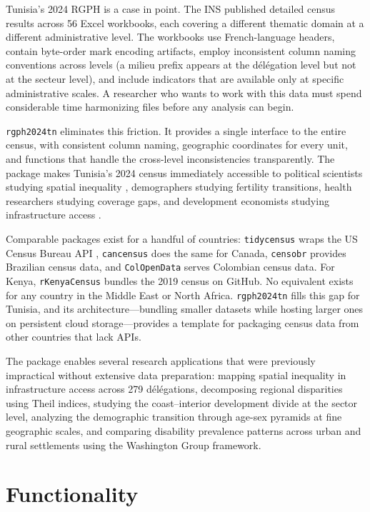 \documentclass[12pt]{article}
\begin{document}
Tunisia's 2024 RGPH is a case in point. The INS published detailed census results across 56 Excel workbooks, each covering a different thematic domain at a different administrative level. The workbooks use French-language headers, contain byte-order mark encoding artifacts, employ inconsistent column naming conventions across levels (a milieu prefix appears at the d\'{e}l\'{e}gation level but not at the secteur level), and include indicators that are available only at specific administrative scales. A researcher who wants to work with this data must spend considerable time harmonizing files before any analysis can begin.

\texttt{rgph2024tn} eliminates this friction. It provides a single interface to the entire census, with consistent column naming, geographic coordinates for every unit, and functions that handle the cross-level inconsistencies transparently. The package makes Tunisia's 2024 census immediately accessible to political scientists studying spatial inequality \citep{porteous2022research}, demographers studying fertility transitions, health researchers studying coverage gaps, and development economists studying infrastructure access \citep{stacy2025datause}.

Comparable packages exist for a handful of countries: \texttt{tidycensus} wraps the US Census Bureau API \citep{walker2023tidycensus}, \texttt{cancensus} does the same for Canada, \texttt{censobr} provides Brazilian census data, and \texttt{ColOpenData} serves Colombian census data. For Kenya, \texttt{rKenyaCensus} bundles the 2019 census on GitHub. No equivalent exists for any country in the Middle East or North Africa. \texttt{rgph2024tn} fills this gap for Tunisia, and its architecture---bundling smaller datasets while hosting larger ones on persistent cloud storage---provides a template for packaging census data from other countries that lack APIs.

The package enables several research applications that were previously impractical without extensive data preparation: mapping spatial inequality in infrastructure access across 279 d\'{e}l\'{e}gations, decomposing regional disparities using Theil indices, studying the coast--interior development divide at the sector level, analyzing the demographic transition through age-sex pyramids at fine geographic scales, and comparing disability prevalence patterns across urban and rural settlements using the Washington Group framework.


\section*{Functionality}
\end{document}
